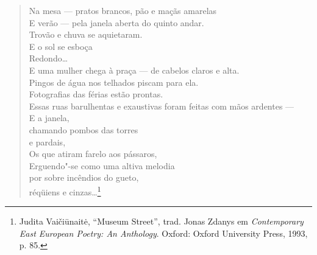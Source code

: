 \begin{verse}
Na mesa --- pratos brancos, pão e maçãs amarelas\\
E verão --- pela janela aberta do quinto andar.\\
Trovão e chuva se aquietaram.\\
\quad E o sol se esboça\\
Redondo\ldots{}\\
E uma mulher chega à praça --- de cabelos claros e \qb{}alta.\\
Pingos de água nos telhados piscam para ela.\\
Fotografias das férias estão prontas.\\
Essas ruas barulhentas e exaustivas foram feitas \qb{}com mãos ardentes ---\\
E a janela,\\
\quad chamando pombos das torres\\
\quad \quad e pardais,\\
Os que atiram farelo aos pássaros,\\
Erguendo"-se como uma altiva melodia\\
\quad por sobre incêndios do gueto,\\
\quad \quad réqüiens e cinzas\ldots{}\footnote{Judita Vaičiūnaitė, ``Museum Street'', trad. Jonas Zdanys em \textit{Contemporary East European Poetry: An Anthology}. Oxford: Oxford University Press, 1993, p. 85.} 
\end{verse}

